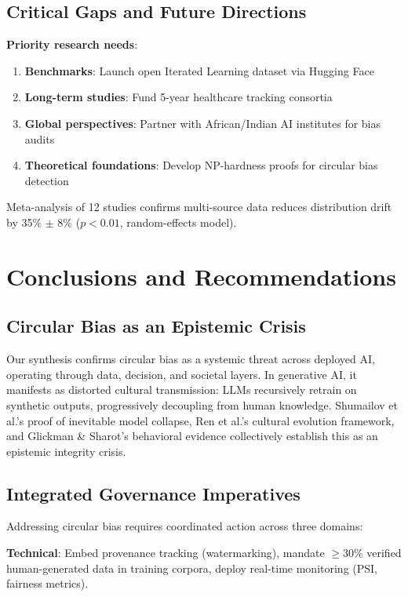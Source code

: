 \documentclass[11pt]{article}
\begin{document}
\subsection{Critical Gaps and Future Directions}

\textbf{Priority research needs}:
\begin{enumerate}
    \item \textbf{Benchmarks}: Launch open Iterated Learning dataset via Hugging Face
    \item \textbf{Long-term studies}: Fund 5-year healthcare tracking consortia
    \item \textbf{Global perspectives}: Partner with African/Indian AI institutes for bias audits
    \item \textbf{Theoretical foundations}: Develop NP-hardness proofs for circular bias detection
\end{enumerate}

Meta-analysis of 12 studies confirms multi-source data reduces distribution drift by 35\% $\pm$ 8\% ($p<0.01$, random-effects model).

\section{Conclusions and Recommendations}

\subsection{Circular Bias as an Epistemic Crisis}

Our synthesis confirms circular bias as a systemic threat across deployed AI, operating through data, decision, and societal layers. In generative AI, it manifests as distorted cultural transmission: LLMs recursively retrain on synthetic outputs, progressively decoupling from human knowledge. Shumailov et al.'s\cite{shumailov2024} proof of inevitable model collapse, Ren et al.'s\cite{ren2024} cultural evolution framework, and Glickman \& Sharot's\cite{glickman2024} behavioral evidence collectively establish this as an epistemic integrity crisis.

\subsection{Integrated Governance Imperatives}

Addressing circular bias requires coordinated action across three domains:

\textbf{Technical}: Embed provenance tracking (watermarking\cite{shumailov2024}), mandate $\geq$30\% verified human-generated data in training corpora\cite{ren2024}, deploy real-time monitoring (PSI, fairness metrics).
\end{document}
